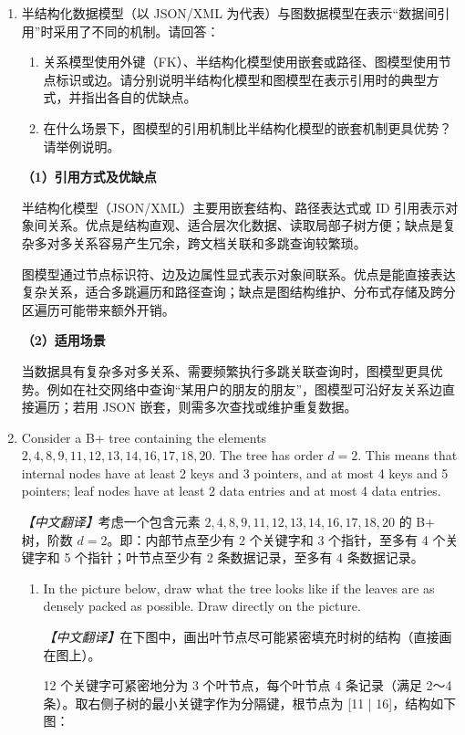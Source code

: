 \documentclass[UTF8,a4paper,11pt]{ctexart}
\newenvironment{answer}%
  {\begin{ans}\noindent{\bfseries\color{ansframe}【答案】}\hspace{0.4em}}%
  {\end{ans}}
\begin{document}
\begin{enumerate}
\item 半结构化数据模型（以 JSON/XML 为代表）与图数据模型在表示“数据间引用”时采用了不同的机制。请回答：
\begin{enumerate}
\item 关系模型使用外键（FK）、半结构化模型使用嵌套或路径、图模型使用节点标识或边。请分别说明半结构化模型和图模型在表示引用时的典型方式，并指出各自的优缺点。
\item 在什么场景下，图模型的引用机制比半结构化模型的嵌套机制更具优势？请举例说明。
\end{enumerate}
\begin{answer}
\textbf{（1）引用方式及优缺点}\par
半结构化模型（JSON/XML）主要用嵌套结构、路径表达式或 ID 引用表示对象间关系。优点是结构直观、适合层次化数据、读取局部子树方便；缺点是复杂多对多关系容易产生冗余，跨文档关联和多跳查询较繁琐。\par
图模型通过节点标识符、边及边属性显式表示对象间联系。优点是能直接表达复杂关系，适合多跳遍历和路径查询；缺点是图结构维护、分布式存储及跨分区遍历可能带来额外开销。\par
\textbf{（2）适用场景}\par
当数据具有复杂多对多关系、需要频繁执行多跳关联查询时，图模型更具优势。例如在社交网络中查询“某用户的朋友的朋友”，图模型可沿好友关系边直接遍历；若用 JSON 嵌套，则需多次查找或维护重复数据。
\end{answer}

\item Consider a B+ tree containing the elements $2,4,8,9,11,12,13,14,16,17,18,20$. The tree has order $d = 2$. This means that internal nodes have at least 2 keys and 3 pointers, and at most 4 keys and 5 pointers; leaf nodes have at least 2 data entries and at most 4 data entries.

\noindent\textit{【中文翻译】}考虑一个包含元素 $2,4,8,9,11,12,13,14,16,17,18,20$ 的 B+ 树，阶数 $d=2$。即：内部节点至少有 2 个关键字和 3 个指针，至多有 4 个关键字和 5 个指针；叶节点至少有 2 条数据记录，至多有 4 条数据记录。

\begin{enumerate}
\item In the picture below, draw what the tree looks like if the leaves are as densely packed as possible. Draw directly on the picture.

\noindent\textit{【中文翻译】}在下图中，画出叶节点尽可能紧密填充时树的结构（直接画在图上）。

\begin{answer}
12 个关键字可紧密地分为 3 个叶节点，每个叶节点 4 条记录（满足 2～4 条）。取右侧子树的最小关键字作为分隔键，根节点为 [11 | 16]，结构如下图：


\end{answer}
\end{enumerate}
\end{enumerate}
\end{document}
